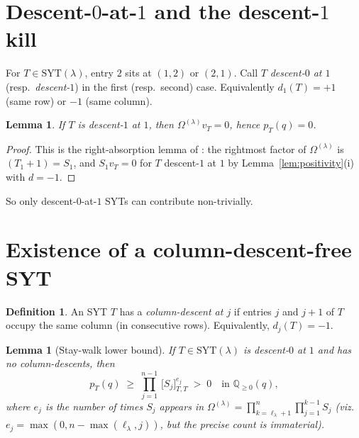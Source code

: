 \documentclass[11pt]{article}
\newtheorem{lemma}[theorem]{Lemma}
\theoremstyle{definition}
\newtheorem{definition}[theorem]{Definition}
\newcommand{\Om}{\Omega}
\newcommand{\SYT}{\mathrm{SYT}}
\begin{document}
\section{Descent-$0$-at-$1$ and the descent-$1$ kill}\label{sec:descent-split}

For $T \in \SYT(\lambda)$, entry $2$ sits at $(1,2)$ or $(2,1)$.  Call
$T$ \emph{descent-$0$ at $1$} (resp.\ \emph{descent-$1$}) in the first
(resp.\ second) case.  Equivalently $d_1(T) = +1$ (same row) or $-1$
(same column).

\begin{lemma}\label{lem:d1-kill}
If $T$ is descent-$1$ at $1$, then $\Om^{(\lambda)} v_T = 0$, hence
$p_T(q) = 0$.
\end{lemma}

\begin{proof}
This is the right-absorption lemma of \cite{traceVanishingMay16}: the
rightmost factor of $\Om^{(\lambda)}$ is $(T_1 + 1) = S_1$, and
$S_1 v_T = 0$ for $T$ descent-$1$ at $1$ by
Lemma~\ref{lem:positivity}(i) with $d = -1$.
\end{proof}

So only descent-$0$-at-$1$ SYTs can contribute non-trivially.

\section{Existence of a column-descent-free SYT}\label{sec:existence}

\begin{definition}\label{def:col-desc}
An SYT $T$ has a \emph{column-descent at $j$} if entries $j$ and $j+1$
of $T$ occupy the same column (in consecutive rows).  Equivalently,
$d_j(T) = -1$.
\end{definition}

\begin{lemma}[Stay-walk lower bound]\label{lem:stay-walk}
If $T \in \SYT(\lambda)$ is descent-$0$ at $1$ and has no
column-descents, then
\[
   p_T(q) \;\ge\; \prod_{j=1}^{n-1}\, \bigl[S_j\bigr]_{T,T}^{e_j} \;>\; 0
   \quad\text{in } \mathbb{Q}_{\ge 0}(q),
\]
where $e_j$ is the number of times $S_j$ appears in
$\Om^{(\lambda)} = \prod_{k=\ell_\lambda+1}^{n} \prod_{j=1}^{k-1} S_j$
(viz.\ $e_j = \max(0, n - \max(\ell_\lambda, j))$, but the precise count
is immaterial).
\end{lemma}
\end{document}
